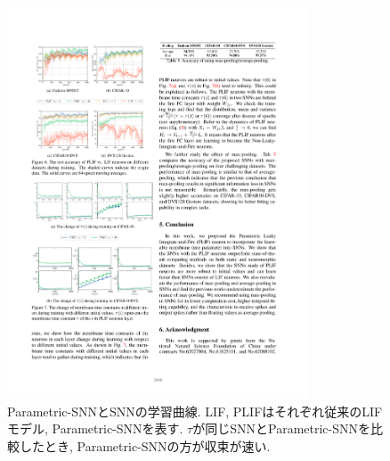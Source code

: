 \begin{figure}[htb]
    \centering
    \includegraphics[width=0.8\textwidth]{Static/chap1_paramsnn_traincurve.pdf}
    \caption[Parametric-SNNとSNNの学習曲線]{
        Parametric-SNNとSNNの学習曲線\cite{paramsnn}.
        LIF, PLIFはそれぞれ従来のLIFモデル, Parametric-SNNを表す.
        $\tau$が同じSNNとParametric-SNNを比較したとき, Parametric-SNNの方が収束が速い.
    }
    \label{fig:paramsnn:traincurve}
\end{figure}


